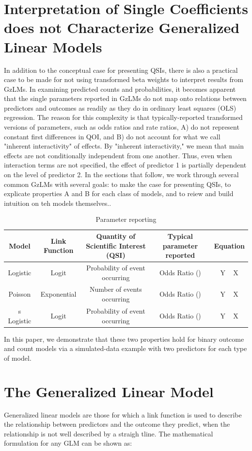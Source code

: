 \documentclass[jou, apacite]{apa6}
\begin{document}
\section{Interpretation of Single Coefficients does not Characterize Generalized Linear Models}
In addition to the conceptual case for presenting QSIs, there is also a practical case to be made for not using transformed beta weights to interpret results from GzLMs.
In examining predicted counts and probabilities, it becomes apparent that the single parameters reported in GzLMs do not map onto relations between predictors and outcomes as readily as they do in ordinary least squares (OLS) regression. 
The reason for this complexity is that typically-reported transformed versions of parameters, such as odds ratios and rate ratios, A) do not represent constant first differences in QOI, and B) do not account for what we call "inherent interactivity" of effects. 
By "inherent interactivity," we mean that main effects are not conditionally independent from one another. 
Thus, even when interaction terms are not specified, the effect of predictor 1 is partially dependent on the level of predictor 2.
In the sections that follow, we work through several common GzLMs with several goals: to make the case for presenting QSIs, to explicate properties A and B for each class of models, and to reiew and build intuition on teh models themselves..

\begin{table}
\begin{tabularx}{\textwidth}{c c c c c}
\toprule 
Model & Link Function & Quantity of Scientific Interest (QSI) & Typical parameter reported & Equation \\
\midrule
Logistic & Logit & Probability of event occurring & Odds Ratio () & Y ~ X \\
Poisson & Exponential & Number of events occurring & Odds Ratio () & Y ~ X \\s
Logistic & Logit & Probability of event occurring & Odds Ratio () & Y ~ X \\
\bottomrule
\end{tabularx}
\caption{Parameter reporting}
\end{table}

In this paper, we demonstrate that these two properties hold for binary outcome and count models via a simulated-data example with two predictors for each type of model.
 
\section{The Generalized Linear Model}
Generalized linear models are those for which a link function is used to describe the relationship between predictors and the outcome they predict, when the relationship is not well described by a straigh tline. 
The mathematical formulation for any GLM can be shown as:
\end{document}
